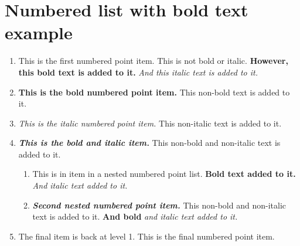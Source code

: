 \documentclass[a4paper]{report}
\begin{document}
\chapter{Numbered list with bold text example}
\begin{enumerate}
\item This is the first numbered point item. This is not bold or italic.\textbf{ However, this bold text is added to it.}\textit{ And this italic text is added to it.}
\item \textbf{This is the bold numbered point item.} This non-bold text is added to it.
\item \textit{This is the italic numbered point item.} This non-italic text is added to it.
\item \textit{\textbf{This is the bold and italic item.}} This non-bold and non-italic text is added to it.
\begin{enumerate}
\item This is in item in a nested numbered point list.\textbf{ Bold text added to it.}\textit{ And italic text added to it.}
\item \textit{\textbf{Second nested numbered point item.}} This non-bold and non-italic text is added to it.\textbf{ And bold}\textit{ and italic text added to it.}
\end{enumerate}
\item The final item is back at level 1. This is the final numbered point item.
\end{enumerate}
\end{document}
